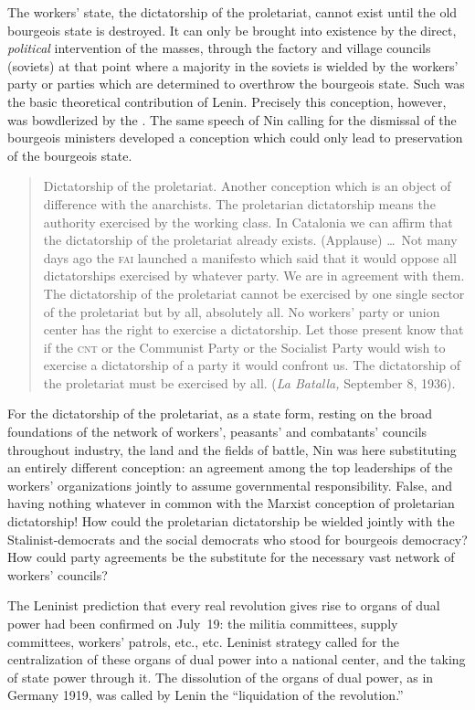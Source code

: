 The workers’ state, the dictatorship of the proletariat, cannot exist until the old bourgeois state is destroyed. It can only be brought into existence by the direct, \emph{political} intervention of the masses, through the factory and village councils (soviets) at that point where a majority in the soviets is wielded by the workers’ party or parties which are determined to overthrow the bourgeois state. Such was the basic theoretical contribution of Lenin. Precisely this conception, however, was bowdlerized by the \POUM\kn. The same speech of Nin calling for the dismissal of the bourgeois ministers developed a conception which could only lead to preservation of the bourgeois state.

\begin{quotation}
  Dictatorship of the proletariat. Another conception which is an object of difference with the anarchists. The proletarian dictatorship means the authority exercised by the working class. In Catalonia we can affirm that the dictatorship of the proletariat already exists. (Applause) \dots\ Not many days ago the \textsc{fai} launched a manifesto which said that it would oppose all dictatorships exercised by whatever party. We are in agreement with them. The dictatorship of the proletariat cannot be exercised by one single sector of the proletariat but by all, absolutely all. No workers’ party or union center has the right to exercise a dictatorship. Let those present know that if the \textsc{cnt} or the Communist Party or the Socialist Party would wish to exercise a dictatorship of a party it would confront us. The dictatorship of the proletariat must be exercised by all. (\emph{La Batalla,} September 8, 1936).
\end{quotation}

For the dictatorship of the proletariat, as a state form, resting on the broad foundations of the network of workers’, peasants’ and combatants’ councils throughout industry, the land and the fields of battle, Nin was here substituting an entirely different conception: an agreement among the top leaderships of the workers’ organizations jointly to assume governmental responsibility. False, and having nothing whatever in common with the Marxist conception of proletarian dictatorship! How could the proletarian dictatorship be wielded jointly with the Stalinist-democrats and the social democrats who stood for bourgeois democracy? How could party agreements be the substitute for the necessary vast network of workers’ councils?

The Leninist prediction that every real revolution gives rise to organs of dual power had been confirmed on July~19: the militia committees, supply committees, workers’ patrols, etc., etc. Leninist strategy called for the centralization of these organs of dual power into a national center, and the taking of state power through it. The dissolution of the organs of dual power, as in Germany 1919, was called by Lenin the ``liquidation of the revolution.''


